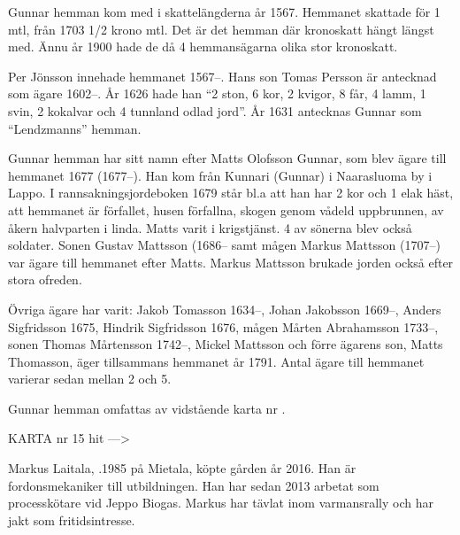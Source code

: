 
Gunnar hemman kom med i skattelängderna år 1567. Hemmanet skattade för 1 mtl, från 1703  1/2 krono mtl. Det är det hemman där kronoskatt hängt längst med. Ännu år 1900 hade de då 4 hemmansägarna olika stor kronoskatt.

Per Jönsson innehade hemmanet 1567--. Hans son Tomas Persson är antecknad som ägare 1602--. År 1626 hade han ``2 ston, 6 kor, 2 kvigor, 8 får, 4 lamm, 1 svin, 2 kokalvar och 4 tunnland odlad jord''. År 1631 antecknas Gunnar som ``Lendzmanns'' hemman.

Gunnar hemman har sitt namn efter Matts Olofsson Gunnar, som blev ägare till hemmanet 1677 (1677--). Han kom från Kunnari (Gunnar) i Naarasluoma by i Lappo. I rannsakningsjordeboken 1679 står bl.a att han har 2 kor och 1 elak häst, att hemmanet är förfallet, husen förfallna, skogen genom vådeld uppbrunnen, av åkern halvparten i linda. Matts varit i krigstjänst. 4 av sönerna blev också soldater. Sonen Gustav Mattsson (1686-- samt mågen Markus Mattsson (1707--) var ägare till hemmanet efter Matts. Markus Mattsson brukade jorden också efter stora ofreden.

Övriga ägare har varit: Jakob Tomasson 1634--, Johan Jakobsson 1669--, Anders Sigfridsson 1675,  Hindrik Sigfridsson 1676,  mågen Mårten Abrahamsson 1733--, sonen Thomas Mårtensson 1742--, Mickel Mattsson och förre ägarens son, Matts Thomasson, äger tillsammans hemmanet år 1791. Antal ägare till hemmanet varierar sedan mellan 2 och 5.


Gunnar hemman omfattas av vidstående karta nr .


KARTA nr 15 hit --->





Markus Laitala, .1985 på Mietala, köpte gården år 2016. Han är fordonsmekaniker till utbildningen. Han har sedan 2013 arbetat som processkötare vid Jeppo Biogas. Markus har tävlat inom varmansrally och har jakt som fritidsintresse.


